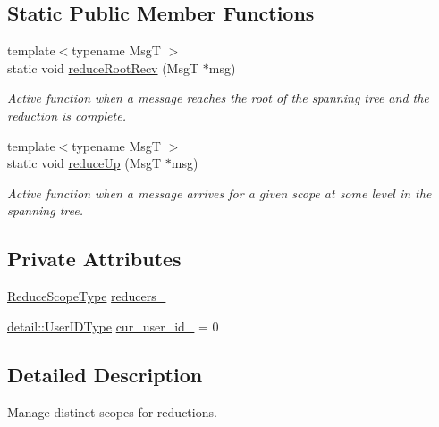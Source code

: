 \subsection*{Static Public Member Functions}
\begin{DoxyCompactItemize}
\item 
{\footnotesize template$<$typename MsgT $>$ }\\static void \hyperlink{structvt_1_1collective_1_1reduce_1_1_reduce_manager_a7ee21e635c585acc7d7339911a0900eb}{reduce\+Root\+Recv} (MsgT $\ast$msg)
\begin{DoxyCompactList}\small\item\em Active function when a message reaches the root of the spanning tree and the reduction is complete. \end{DoxyCompactList}\item 
{\footnotesize template$<$typename MsgT $>$ }\\static void \hyperlink{structvt_1_1collective_1_1reduce_1_1_reduce_manager_a744a70b8e28ef9c58cb9ccdb06493d15}{reduce\+Up} (MsgT $\ast$msg)
\begin{DoxyCompactList}\small\item\em Active function when a message arrives for a given scope at some level in the spanning tree. \end{DoxyCompactList}\end{DoxyCompactItemize}
\subsection*{Private Attributes}
\begin{DoxyCompactItemize}
\item 
\hyperlink{structvt_1_1collective_1_1reduce_1_1_reduce_manager_a2c340e5d3b12e4f2df64b9c1502445cf}{Reduce\+Scope\+Type} \hyperlink{structvt_1_1collective_1_1reduce_1_1_reduce_manager_a8226dde1ab69b8332db65f558f405ad5}{reducers\+\_\+}
\item 
\hyperlink{namespacevt_1_1collective_1_1reduce_1_1detail_ae82d7b96b0885b9b7dfb0104398beead}{detail\+::\+User\+I\+D\+Type} \hyperlink{structvt_1_1collective_1_1reduce_1_1_reduce_manager_a716c66493c02898d5ac8c2b8ca62efd0}{cur\+\_\+user\+\_\+id\+\_\+} = 0
\end{DoxyCompactItemize}


\subsection{Detailed Description}
Manage distinct scopes for reductions. 

